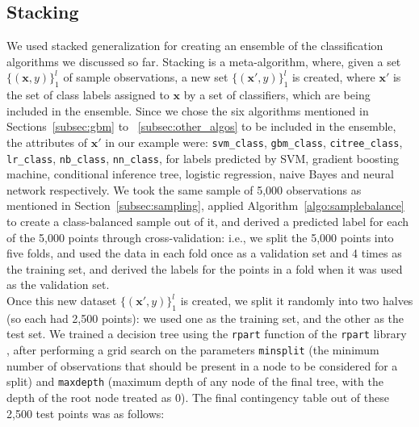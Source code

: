 \subsection{Stacking}
\label{subsec:stacking}
We used stacked generalization \cite{Wolpert92} for creating an ensemble of the classification algorithms we discussed so far. Stacking is a meta-algorithm, where, given a set $\{(\mathbf{x}, y)\}_1^l$ of sample observations, a new set $\{({\mathbf{x}}', y)\}_1^l$ is created, where ${\mathbf{x}}'$ is the set of class labels assigned to $\mathbf{x}$ by a set of classifiers, which are being included in the ensemble. Since we chose the six algorithms mentioned in Sections~\ref{subsec:gbm} to ~\ref{subsec:other_algos} to be included in the ensemble, the attributes of ${\mathbf{x}}'$ in our example were: \texttt{svm\_class},  \texttt{gbm\_class}, \texttt{citree\_class}, \texttt{lr\_class}, \texttt{nb\_class}, \texttt{nn\_class}, for labels predicted by SVM, gradient boosting machine, conditional inference tree, logistic regression, naive Bayes and neural network respectively. We took the same sample of 5,000 observations as mentioned in Section~\ref{subsec:sampling}, applied Algorithm~\ref{algo:samplebalance} to create a class-balanced sample out of it, and derived a predicted label for each of the 5,000 points through cross-validation: i.e., we split the 5,000 points into five folds, and used the data in each fold once as a validation set and 4 times as the training set, and derived the labels for the points in a fold when it was used as the validation set.\\

Once this new dataset $\{({\mathbf{x}}', y)\}_1^l$ is created, we split it randomly into two halves (so each had 2,500 points): we used one as the training set, and the other as the test set. We trained a decision tree using the \texttt{rpart} function of the \texttt{rpart} library \cite{rpart}, after performing a grid search on the parameters \texttt{minsplit} (the minimum number of observations that should be present in a node to be considered for a split) and \texttt{maxdepth} (maximum depth of any node of the final tree, with the depth of the root node treated as 0). The final contingency table out of these 2,500 test points was as follows:


